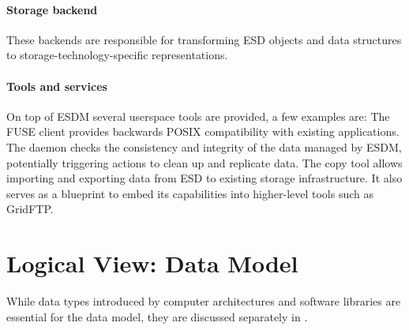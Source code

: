 \paragraph{Storage backend}
These backends are responsible for transforming ESD objects and data structures to storage-technology-specific representations.


\paragraph{Tools and services}
On top of ESDM several userspace tools are provided, a few examples are:
The FUSE client provides backwards POSIX compatibility with existing applications.
The daemon checks the consistency and integrity of the data managed by ESDM, potentially triggering actions to clean up and replicate data.
The copy tool allows importing and exporting data from ESD to existing storage infrastructure.
It also serves as a blueprint to embed its capabilities into higher-level tools such as GridFTP.





\section{Logical View: Data Model}
\label{sec: viewpoints/logical/data model}


While data types introduced by computer architectures and software libraries are essential for the data model, they are discussed separately in .



